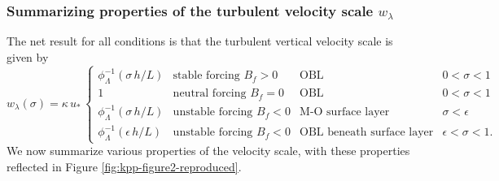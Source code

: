 \subsubsection{Summarizing properties of the turbulent velocity scale $w_{\lambda}$}

The net result for all conditions is that the turbulent vertical
velocity scale is given by
\begin{equation}
  w_{\lambda}(\sigma)  = \kappa \, u_{*} \, \left\{
 \begin{array}{llll}
   \phi^{-1}_{\Lambda}(\sigma \, h / L)   
  &\mbox{stable forcing $B_{f} > 0$} & \mbox{OBL}
  &\mbox{$0 < \sigma < 1$}
\\
   1 
  &\mbox{neutral forcing $B_{f} = 0$} & \mbox{OBL}
  &\mbox{$0 < \sigma < 1$}
\\
  \phi^{-1}_{\Lambda}(\sigma \, h / L)   
  &\mbox{unstable forcing $B_{f} < 0$} &\mbox{M-O surface layer}
  &\mbox{$\sigma <  \epsilon$}
\\
  \phi^{-1}_{\Lambda}(\epsilon \, h / L)   
 &\mbox{unstable forcing $B_{f} < 0$} &\mbox{OBL beneath surface layer}
 &\mbox{$\epsilon < \sigma < 1$.}
\end{array} 
 \right.
\label{eq:wlambda-general}
\end{equation}
We now summarize various properties of the velocity scale, with these
properties reflected in Figure \ref{fig:kpp-figure2-reproduced}.
